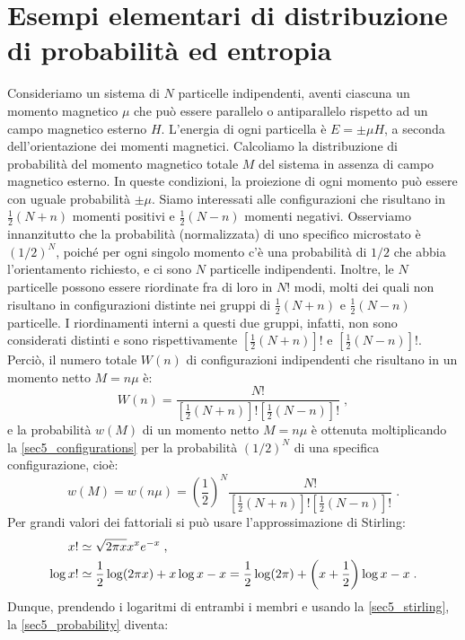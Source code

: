 \section{Esempi elementari di distribuzione di probabilità ed entropia}
Consideriamo un sistema di $N$ particelle indipendenti, aventi ciascuna un momento magnetico $\mu$ che può essere parallelo o 
antiparallelo rispetto ad un campo magnetico esterno $H$. L'energia di ogni particella è $E=\pm \mu H$, a seconda dell'orientazione 
dei momenti magnetici. Calcoliamo la distribuzione di probabilità del momento magnetico totale $M$ del sistema in assenza di campo 
magnetico esterno. In queste condizioni, la proiezione di ogni momento può essere con uguale probabilità $\pm \mu$. Siamo interessati 
alle configurazioni che risultano in $\frac{1}{2}(N+n)$ momenti positivi e $\frac{1}{2}(N-n)$ momenti negativi. Osserviamo innanzitutto 
che la probabilità (normalizzata) di uno specifico microstato è $(1/2)^N$, poiché per ogni singolo momento c'è una probabilità 
di $1/2$ che abbia l'orientamento richiesto, e ci sono $N$ particelle indipendenti. Inoltre, le $N$ particelle possono essere 
riordinate fra di loro in $N!$ modi, molti dei quali non risultano in configurazioni distinte nei gruppi di $\frac{1}{2}(N+n)$ e $
\frac{1}{2}(N-n)$ particelle. I riordinamenti interni a questi due gruppi, infatti, non sono considerati distinti e sono 
rispettivamente $[\frac{1}{2}(N+n)]!$ e $[\frac{1}{2}(N-n)]!$. Perciò, il numero totale $W(n)$ di configurazioni indipendenti che 
risultano in un momento netto $M=n\mu$ è:
\begin{equation}
\label{sec5_configurations}
 W(n)=\frac{N!}{[\frac{1}{2}(N+n)]![\frac{1}{2}(N-n)]!}\;,
\end{equation}
e la probabilità $w(M)$ di un momento netto $M=n\mu$ è ottenuta moltiplicando la \eqref{sec5_configurations} per la probabilità $(1/2)^N$ di una specifica configurazione, cioè:
\begin{equation}
\label{sec5_probability}
 w(M)=w(n\mu)=\left(\frac{1}{2}\right)^N\frac{N!}{[\frac{1}{2}(N+n)]![\frac{1}{2}(N-n)]!}\;.
\end{equation}
Per grandi valori dei fattoriali si può usare l'approssimazione di Stirling:
\begin{align}
x! &\simeq \sqrt{2\pi x}x^xe^{-x}\;, \notag \\
\log x! &\simeq \frac{1}{2}\log(2\pi x)+x\log x-x=\frac{1}{2}\log(2\pi)+\left(x+\frac{1}{2}\right)\log x -x\;. \label{sec5_stirling}
\end{align}
Dunque, prendendo i logaritmi di entrambi i membri e usando la \eqref{sec5_stirling}, la \eqref{sec5_probability} diventa:
